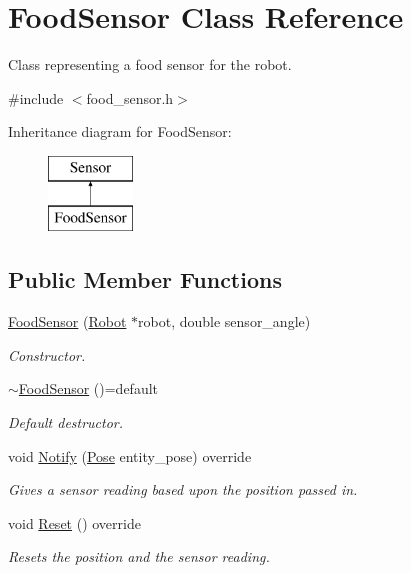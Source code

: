 \hypertarget{class_food_sensor}{}\section{Food\+Sensor Class Reference}
\label{class_food_sensor}


Class representing a food sensor for the robot.  




{\ttfamily \#include $<$food\+\_\+sensor.\+h$>$}

Inheritance diagram for Food\+Sensor\+:\begin{figure}[H]
\begin{center}
\leavevmode
\includegraphics[height=2.000000cm]{class_food_sensor}
\end{center}
\end{figure}
\subsection*{Public Member Functions}
\begin{DoxyCompactItemize}
\item 
\mbox{\hyperlink{class_food_sensor_a80bc0b7b4d46a87a50c0d0094169c9f9}{Food\+Sensor}} (\mbox{\hyperlink{class_robot}{Robot}} $\ast$robot, double sensor\+\_\+angle)
\begin{DoxyCompactList}\small\item\em Constructor. \end{DoxyCompactList}\item 
\mbox{\label{class_food_sensor_a749728b0e8179cac51323f9a15750dc3}} 
\mbox{\hyperlink{class_food_sensor_a749728b0e8179cac51323f9a15750dc3}{$\sim$\+Food\+Sensor}} ()=default
\begin{DoxyCompactList}\small\item\em Default destructor. \end{DoxyCompactList}\item 
void \mbox{\hyperlink{class_food_sensor_a9220e06a42f2f8385d308a2c88303416}{Notify}} (\mbox{\hyperlink{struct_pose}{Pose}} entity\+\_\+pose) override
\begin{DoxyCompactList}\small\item\em Gives a sensor reading based upon the position passed in. \end{DoxyCompactList}\item 
\mbox{\label{class_food_sensor_a1b60ca32e66f68f2ca7ddd1d6d709764}} 
void \mbox{\hyperlink{class_food_sensor_a1b60ca32e66f68f2ca7ddd1d6d709764}{Reset}} () override
\begin{DoxyCompactList}\small\item\em Resets the position and the sensor reading. \end{DoxyCompactList}\end{DoxyCompactItemize}
